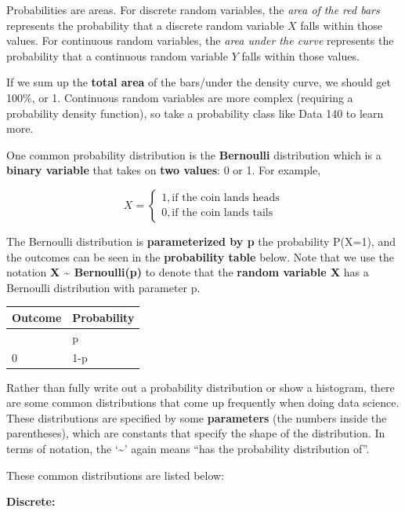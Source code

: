 \documentclass[
  letterpaper,
  DIV=11,
  numbers=noendperiod]{scrreprt}
\begin{document}
Probabilities are areas. For discrete random variables, the \emph{area
of the red bars} represents the probability that a discrete random
variable \(X\) falls within those values. For continuous random
variables, the \emph{area under the curve} represents the probability
that a continuous random variable \(Y\) falls within those values.

If we sum up the \textbf{total area} of the bars/under the density
curve, we should get 100\%, or 1. Continuous random variables are more
complex (requiring a probability density function), so take a
probability class like Data 140 to learn more.

One common probability distribution is the \textbf{Bernoulli}
distribution which is a \textbf{binary variable} that takes on
\textbf{two values}: 0 or 1. For example,

\[X = \begin{cases} 
      1, \text{if the coin lands heads} \\
      0, \text{if the coin lands tails} 
   \end{cases}\]

The Bernoulli distribution is \textbf{parameterized by p} the
probability P(X=1), and the outcomes can be seen in the
\textbf{probability table} below. Note that we use the notation
\textbf{X \textasciitilde{} Bernoulli(p)} to denote that the
\textbf{random variable X} has a Bernoulli distribution with parameter
p.

\begin{longtable}[]{@{}ll@{}}
\toprule\noalign{}
Outcome & Probability \\
\midrule\noalign{}
\endhead
\bottomrule\noalign{}
\endlastfoot
1 & p \\
0 & 1-p \\
\end{longtable}

Rather than fully write out a probability distribution or show a
histogram, there are some common distributions that come up frequently
when doing data science. These distributions are specified by some
\textbf{parameters} (the numbers inside the parentheses), which are
constants that specify the shape of the distribution. In terms of
notation, the `\textasciitilde{}' again means ``has the probability
distribution of''.

These common distributions are listed below:

\textbf{Discrete:}
\end{document}

